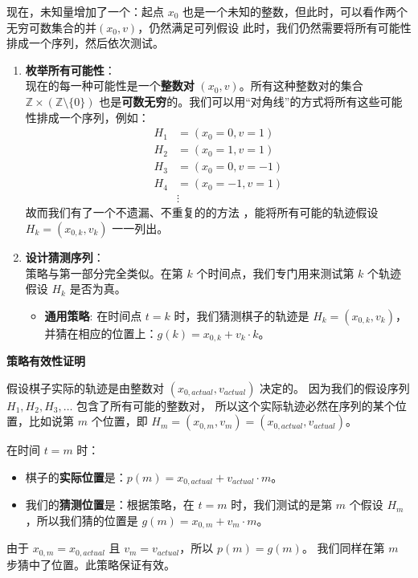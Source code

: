 \documentclass[UTF8]{ctexart}
\begin{document}
现在，未知量增加了一个：起点 $x_0$ 也是一个未知的整数，但此时，可以看作两个无穷可数集合的并$(x_0, v)$，仍然满足可列假设
此时，我们仍然需要将所有可能性排成一个序列，然后依次测试。
\begin{enumerate}
    \item \textbf{枚举所有可能性}：\\
    现在的每一种可能性是一个\textbf{整数对} $(x_0, v)$。所有这种整数对的集合 $\mathbb{Z} \times (\mathbb{Z} \setminus \{0\})$ 也是\textbf{可数无穷}的。我们可以用“对角线”的方式将所有这些可能性排成一个序列，例如：
    \begin{align*}
        H_1 &= (x_0=0, v=1) \\
        H_2 &= (x_0=1, v=1) \\
        H_3 &= (x_0=0, v=-1) \\
        H_4 &= (x_0=-1, v=1) \\
        &\vdots
    \end{align*}
    故而我们有了一个不遗漏、不重复的的方法 ，能将所有可能的轨迹假设 $H_k = (x_{0,k}, v_k)$ 一一列出。

    \item \textbf{设计猜测序列}：\\
    策略与第一部分完全类似。在第 $k$ 个时间点，我们专门用来测试第 $k$ 个轨迹假设 $H_k$ 是否为真。
    \begin{itemize}
        \item \textbf{通用策略}: 在时间点 $t=k$ 时，我们猜测棋子的轨迹是 $H_k = (x_{0,k}, v_k)$，
        并猜在相应的位置上：$g(k) = x_{0,k} + v_k \cdot k$。
    \end{itemize}
\end{enumerate}

\textbf{策略有效性证明}

假设棋子实际的轨迹是由整数对 $(x_{0,actual}, v_{actual})$ 决定的。
因为我们的假设序列 $H_1, H_2, H_3, \dots$ 包含了所有可能的整数对，
所以这个实际轨迹必然在序列的某个位置，比如说第 $m$ 个位置，即 $H_m = (x_{0,m}, v_m) = (x_{0,actual}, v_{actual})$。

在时间 $t=m$ 时：
\begin{itemize}
    \item 棋子的\textbf{实际位置}是：$p(m) = x_{0,actual} + v_{actual} \cdot m$。
    \item 我们的\textbf{猜测位置}是：根据策略，在 $t=m$ 时，我们测试的是第 $m$ 个假设 $H_m$，所以我们猜的位置是 $g(m) = x_{0,m} + v_m \cdot m$。
\end{itemize}
由于 $x_{0,m} = x_{0,actual}$ 且 $v_m = v_{actual}$，所以 $p(m) = g(m)$。
我们同样在第 $m$ 步猜中了位置。此策略保证有效。
\end{document}
